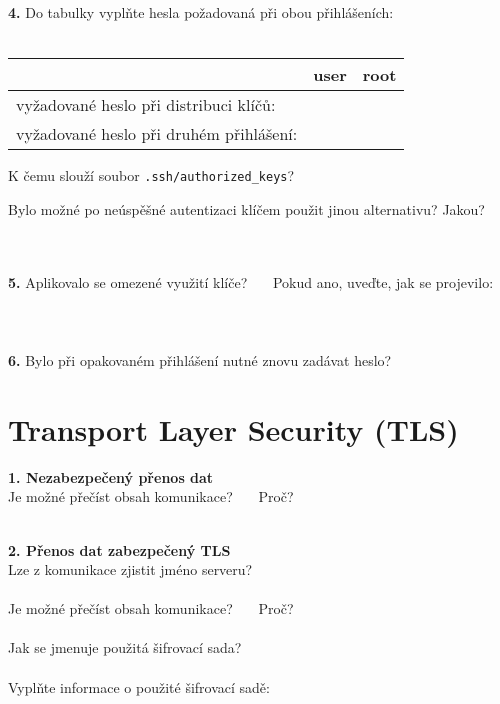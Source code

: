 \documentclass[a4paper,11pt]{article}
\begin{document}
\textbf{4.} Do tabulky vyplňte hesla požadovaná při obou přihlášeních:\\
~\\
\begin{tabular}{|l|c|c|}
\hline
~ & user & root \\
\hline
vyžadované heslo při distribuci klíčů: & \hspace{3cm} & \hspace{3cm} \\
\hline
vyžadované heslo při druhém přihlášení: & \hspace{3cm} & \hspace{3cm} \\
\hline
\end{tabular}

\bigskip
K čemu slouží soubor \texttt{.ssh/authorized\_keys}?
~\\
\underline{\hspace{15cm}}

Bylo možné po neúspěšné autentizaci klíčem použit jinou alternativu? Jakou?
~\\
~\\
~\\
\underline{\hspace{15cm}}

\textbf{5.} Aplikovalo se omezené využití klíče? \underline{\hspace{1cm}} ~~~Pokud ano, uveďte, jak se projevilo:
~\\
~\\
~\\
\underline{\hspace{16.5cm}}
~\\


\textbf{6.} Bylo při opakovaném přihlášení nutné znovu zadávat heslo? \underline{\hspace{1cm}}


\section{Transport Layer Security (TLS)}

\textbf{1. Nezabezpečený přenos dat}\\
Je možné přečíst obsah komunikace? \underline{\hspace{1cm}}~~~Proč?~\underline{\hspace{8cm}}

~\\
\textbf{2. Přenos dat zabezpečený TLS} \\
Lze z komunikace zjistit jméno serveru? \underline{\hspace{1cm}}\\
~\\
Je možné přečíst obsah komunikace? \underline{\hspace{1cm}}~~~Proč?~\underline{\hspace{8cm}}\\
~\\
Jak se jmenuje použitá šifrovací sada? \underline{\hspace{7cm}}\\
~\\
Vyplňte informace o použité šifrovací sadě:\\
\end{document}
